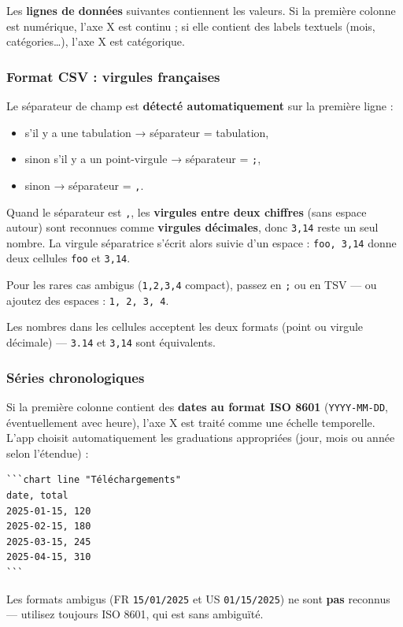 \documentclass[11pt,a4paper]{article}
\theoremstyle{definition}
\begin{document}
Les \textbf{lignes de données} suivantes contiennent les valeurs. Si la
première colonne est numérique, l'axe X est continu ; si elle
contient des labels textuels (mois, catégories…), l'axe X est
catégorique.


\subsubsection{Format CSV : virgules françaises}

Le séparateur de champ est \textbf{détecté automatiquement} sur la
première ligne :


\begin{itemize}
  \item s'il y a une tabulation → séparateur = tabulation,
  \item sinon s'il y a un point-virgule → séparateur = \texttt{;},
  \item sinon → séparateur = \texttt{,}.
\end{itemize}


Quand le séparateur est \texttt{,}, les \textbf{virgules entre deux chiffres}
(sans espace autour) sont reconnues comme \textbf{virgules décimales},
donc \texttt{3,14} reste un seul nombre. La virgule séparatrice s'écrit
alors suivie d'un espace : \texttt{foo, 3,14} donne deux cellules \texttt{foo} et
\texttt{3,14}.


Pour les rares cas ambigus (\texttt{1,2,3,4} compact), passez en \texttt{;} ou en
TSV — ou ajoutez des espaces : \texttt{1, 2, 3, 4}.


Les nombres dans les cellules acceptent les deux formats (point ou
virgule décimale) — \texttt{3.14} et \texttt{3,14} sont équivalents.


\subsubsection{Séries chronologiques}

Si la première colonne contient des \textbf{dates au format ISO 8601}
(\texttt{YYYY-MM-DD}, éventuellement avec heure), l'axe X est traité comme
une échelle temporelle. L'app choisit automatiquement les graduations
appropriées (jour, mois ou année selon l'étendue) :


\begin{lstlisting}
```chart line "Téléchargements"
date, total
2025-01-15, 120
2025-02-15, 180
2025-03-15, 245
2025-04-15, 310
```
\end{lstlisting}


Les formats ambigus (FR \texttt{15/01/2025} et US \texttt{01/15/2025}) ne sont
\textbf{pas} reconnus — utilisez toujours ISO 8601, qui est sans
ambiguïté.
\end{document}
